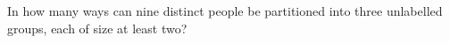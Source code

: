 In how many ways can nine distinct people be partitioned into three unlabelled groups, each of size at least two?
